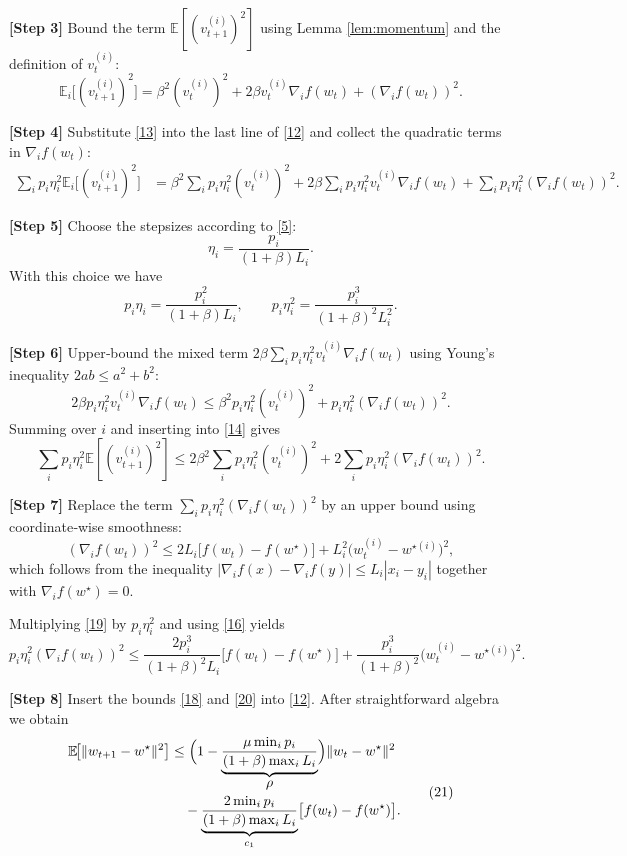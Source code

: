 \documentclass{article}
\newcommand{\E}{\mathbb{E}}
\begin{document}
\medskip
\noindent\textbf{[Step 3]}  Bound the term $\E[(v_{t+1}^{(i)})^{2}]$ using Lemma \ref{lem:momentum} and the definition of $v_t^{(i)}$:
\[
\E_{i}\!\bigl[(v_{t+1}^{(i)})^{2}\bigr]
= \beta^{2}(v_{t}^{(i)})^{2}+2\beta v_{t}^{(i)}\nabla_i f(w_t)+(\nabla_i f(w_t))^{2}.
\tag{13}
\]

\medskip
\noindent\textbf{[Step 4]}  Substitute \eqref{13} into the last line of \eqref{12} and collect the quadratic terms in $\nabla_i f(w_t)$:
\[
\begin{aligned}
\sum_i p_i\eta_i^{2}\E_{i}\!\bigl[(v_{t+1}^{(i)})^{2}\bigr]
&= \beta^{2}\sum_i p_i\eta_i^{2}(v_{t}^{(i)})^{2}
+2\beta\sum_i p_i\eta_i^{2}v_{t}^{(i)}\nabla_i f(w_t)
+\sum_i p_i\eta_i^{2}(\nabla_i f(w_t))^{2}.
\end{aligned}
\tag{14}
\]

\medskip
\noindent\textbf{[Step 5]}  Choose the stepsizes according to \eqref{5}:
\[
\eta_i=\frac{p_i}{(1+\beta)L_i}.
\tag{15}
\]
With this choice we have
\[
p_i\eta_i = \frac{p_i^{2}}{(1+\beta)L_i},\qquad
p_i\eta_i^{2}= \frac{p_i^{3}}{(1+\beta)^{2}L_i^{2}}.
\tag{16}
\]

\medskip
\noindent\textbf{[Step 6]}  Upper‑bound the mixed term $2\beta\sum_i p_i\eta_i^{2}v_{t}^{(i)}\nabla_i f(w_t)$ using Young’s inequality $2ab\le a^{2}+b^{2}$:
\[
2\beta p_i\eta_i^{2}v_{t}^{(i)}\nabla_i f(w_t)
\le \beta^{2}p_i\eta_i^{2}(v_{t}^{(i)})^{2}
+ p_i\eta_i^{2}(\nabla_i f(w_t))^{2}.
\tag{17}
\]
Summing over $i$ and inserting into \eqref{14} gives
\[
\sum_i p_i\eta_i^{2}\E[(v_{t+1}^{(i)})^{2}]
\le 2\beta^{2}\sum_i p_i\eta_i^{2}(v_{t}^{(i)})^{2}
+2\sum_i p_i\eta_i^{2}(\nabla_i f(w_t))^{2}.
\tag{18}
\]

\medskip
\noindent\textbf{[Step 7]}  Replace the term $\sum_i p_i\eta_i^{2}(\nabla_i f(w_t))^{2}$ by an upper bound using coordinate‑wise smoothness:
\[
(\nabla_i f(w_t))^{2}
\le 2L_i\bigl[f(w_t)-f(w^{\star})\bigr]
+L_i^{2}\bigl(w_t^{(i)}-w^{\star(i)}\bigr)^{2},
\tag{19}
\]
which follows from the inequality $|\nabla_i f(x)-\nabla_i f(y)|\le L_i|x_i-y_i|$ together with $ \nabla_i f(w^{\star})=0$.

Multiplying \eqref{19} by $p_i\eta_i^{2}$ and using \eqref{16} yields
\[
p_i\eta_i^{2}(\nabla_i f(w_t))^{2}
\le \frac{2p_i^{3}}{(1+\beta)^{2}L_i}\bigl[f(w_t)-f(w^{\star})\bigr]
+\frac{p_i^{3}}{(1+\beta)^{2}} \bigl(w_t^{(i)}-w^{\star(i)}\bigr)^{2}.
\tag{20}
\]

\medskip
\noindent\textbf{[Step 8]}  Insert the bounds \eqref{18} and \eqref{20} into \eqref{12}. After straightforward algebra we obtain
\[
\begin{aligned}
\E\!\bigl[\|w_{t+1}-w^{\star}\|^{2}\bigr]
&\le \Bigl(1-\underbrace{\frac{\mu\min_i p_i}{(1+\beta)\max_i L_i}}_{\displaystyle \rho}\Bigr)\|w_t-w^{\star}\|^{2}\\
&\quad -\underbrace{\frac{2\min_i p_i}{(1+\beta)\max_i L_i}}_{c_1}\bigl[f(w_t)-f(w^{\star})\bigr].
\end{aligned}
\tag{21}
\]
\end{document}
